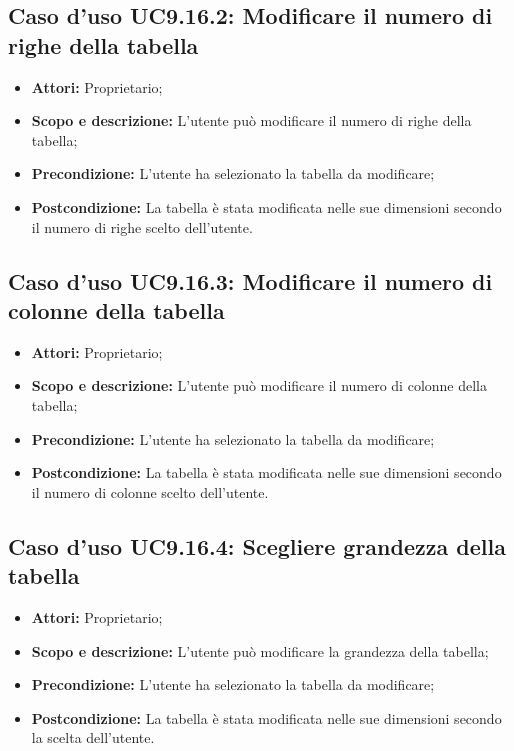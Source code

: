 	\subsection{Caso d'uso UC9.16.2: Modificare il numero di righe della tabella}
	\begin{itemize}
		\item \textbf{Attori:} Proprietario;
		\item \textbf{Scopo e descrizione:} L'utente può modificare il numero di righe della tabella;
		\item \textbf{Precondizione:} L'utente ha selezionato la tabella da modificare;
		\item \textbf{Postcondizione:} La tabella è stata modificata nelle sue dimensioni secondo il numero di righe scelto dell'utente.
	\end{itemize}
	
	\subsection{Caso d'uso UC9.16.3: Modificare il numero di colonne della tabella}
	\begin{itemize}
		\item \textbf{Attori:} Proprietario;
		\item \textbf{Scopo e descrizione:} L'utente può modificare il numero di colonne della tabella;
		\item \textbf{Precondizione:} L'utente ha selezionato la tabella da modificare;
		\item \textbf{Postcondizione:} La tabella è stata modificata nelle sue dimensioni secondo il numero di colonne scelto dell'utente.
	\end{itemize}
	
	\subsection{Caso d'uso UC9.16.4: Scegliere grandezza della tabella}
	\begin{itemize}
		\item \textbf{Attori:} Proprietario;
		\item \textbf{Scopo e descrizione:} L'utente può modificare la grandezza della tabella;
		\item \textbf{Precondizione:} L'utente ha selezionato la tabella da modificare;
		\item \textbf{Postcondizione:} La tabella è stata modificata nelle sue dimensioni secondo la scelta dell'utente.
	\end{itemize}
	
